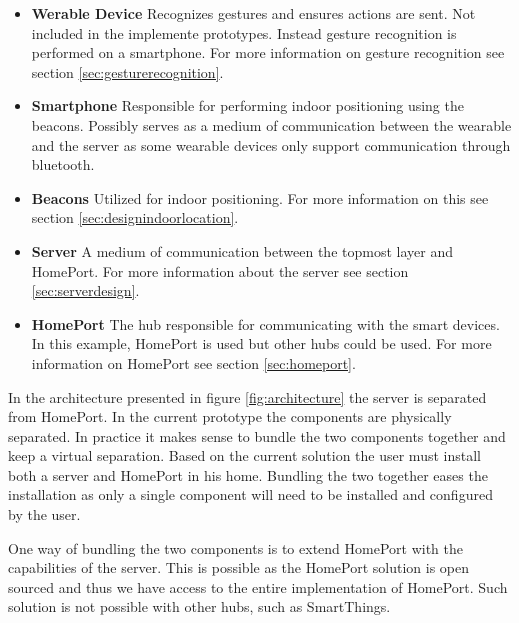 \begin{itemize}
\item \textbf{Werable Device} Recognizes gestures and ensures actions are sent. Not included in the implemente prototypes. Instead gesture recognition is performed on a smartphone. For more information on gesture recognition see section \ref{sec:gesturerecognition}.
\item \textbf{Smartphone} Responsible for performing indoor positioning using the beacons. Possibly serves as a medium of communication between the wearable and the server as some wearable devices only support communication through bluetooth.
\item \textbf{Beacons} Utilized for indoor positioning. For more information on this see section \ref{sec:designindoorlocation}.
\item \textbf{Server} A medium of communication between the topmost layer and HomePort. For more information about the server see section \ref{sec:serverdesign}.
\item \textbf{HomePort} The hub responsible for communicating with the smart devices. In this example, HomePort is used but other hubs could be used. For more information on HomePort see section \ref{sec:homeport}.
\end{itemize}

In the architecture presented in figure \ref{fig:architecture} the server is separated from HomePort. In the current prototype the components are physically separated. In practice it makes sense to bundle the two components together and keep a virtual separation. Based on the current solution the user must install both a server and HomePort in his home. Bundling the two together eases the installation as only a single component will need to be installed and configured by the user.

One way of bundling the two components is to extend HomePort with the capabilities of the server. This is possible as the HomePort solution is open sourced and thus we have access to the entire implementation of HomePort. Such solution is not possible with other hubs, such as SmartThings.

%

